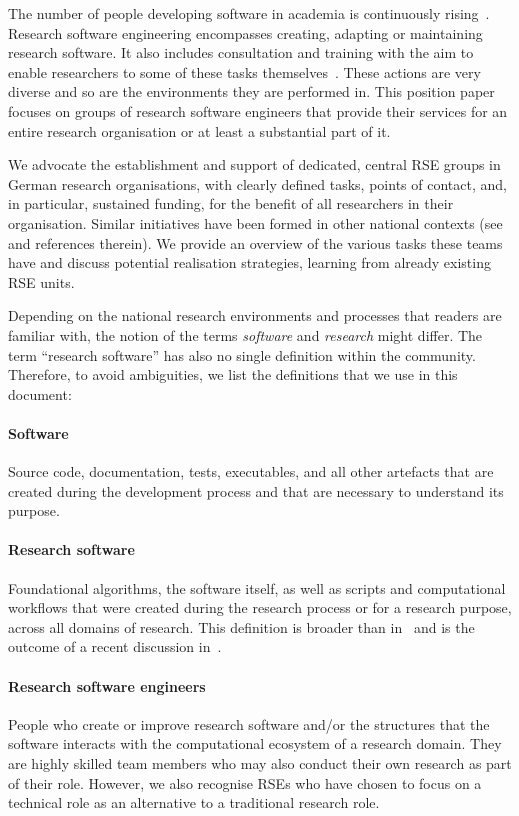 \documentclass[10pt,letterpaper]{article}
\begin{document}
The number of people developing software in academia is continuously rising~\cite{Hannay2009, Hettrick2015}.
Research software engineering encompasses creating, adapting or maintaining research software.
It also includes consultation and training with the aim to enable researchers to some of these tasks themselves~\cite{goth_foundational_competencies_2024}.
These actions are very diverse and so are the environments they are performed in.
This position paper focuses on groups of research software engineers that provide their services for an entire research organisation or at least a substantial part of it.

We advocate the establishment and support of dedicated, central RSE groups in German research organisations, with clearly defined tasks, points of contact, and, in particular, sustained funding, for the benefit of all researchers in their organisation.
Similar initiatives have been formed in other national contexts (see~\cite{barkerkatz2024,martin2023} and references therein).
We provide an overview of the various tasks these teams have and discuss potential realisation strategies, learning from already existing RSE units.

Depending on the national research environments and processes that readers are familiar with, the notion of the terms \emph{software} and \emph{research} might differ.
The term “research software” has also no single definition within the community.
Therefore, to avoid ambiguities, we list the definitions that we use in this document:
\paragraph{Software}
Source code, documentation, tests, executables, and all other artefacts that are created during the development process and that are necessary to understand its purpose.
\paragraph{Research software}
Foundational algorithms, the software itself, as well as scripts and computational workflows that were created during the research process or for a research purpose, across all domains of research.
This definition is broader than in~\cite{FAIR4RS} and is the outcome of a recent discussion in~\cite{Gruenpeter2021}.
\paragraph{Research software engineers}
People who create or improve research software and/or the structures that the software interacts with the computational ecosystem of a research domain.
They are highly skilled team members who may also conduct their own research as part of their role.
However, we also recognise RSEs who have chosen to focus on a technical role as an alternative to a traditional research role.
\end{document}
